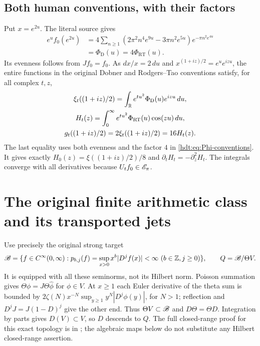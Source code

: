 \documentclass[11pt]{article}
\begin{document}
\subsection{Both human conventions, with their factors}
Put $x=e^{2u}$. The literal source gives
\begin{equation}\label{hdt:eq:Phi-conventions}
\begin{split}
e^u f_0(e^{2u})
&=4\sum_{n\geq1}(2\pi^2n^4e^{9u}-3\pi n^2e^{5u})
e^{-\pi n^2e^{4u}}\\
&=\Phi_{\mathrm D}(u)=4\Phi_{\mathrm{RT}}(u).
\end{split}
\end{equation}
Its evenness follows from $Jf_0=f_0$. As $dx/x=2\,du$ and
$x^{(1+iz)/2}=e^ue^{izu}$, the entire functions in the original
Dobner and Rodgers--Tao conventions satisfy, for all complex $t,z$,
\begin{equation}\label{hdt:eq:constants}
\begin{gathered}
\xi_t((1+iz)/2)=\int_\mathbb R e^{tu^2}\Phi_{\mathrm D}(u)e^{izu}\,du,\\
H_t(z)=\int_0^\infty e^{tu^2}\Phi_{\mathrm{RT}}(u)\cos(zu)\,du,\\
g_t((1+iz)/2)=2\xi_t((1+iz)/2)=16H_t(z).
\end{gathered}
\end{equation}
The last equality uses both evenness and the factor $4$ in
\eqref{hdt:eq:Phi-conventions}. It gives exactly
$H_0(z)=\xi((1+iz)/2)/8$ and $\partial_tH_t=-\partial_z^2H_t$.
The integrals converge with all derivatives because $U_tf_0\in\mathscr E_\pi$.

\section{The original finite arithmetic class and its transported jets}

Use precisely the original strong target
\begin{equation}\label{hdt:eq:B}
\mathscr B=\{f\in C^\infty(0,\infty):
p_{b,j}(f)=\sup_{x>0}x^b|D^jf(x)|<\infty
\ (b\in\mathbb Z,j\geq0)\},\qquad Q=\mathscr B/\Theta V.
\end{equation}
It is equipped with all these seminorms, not its Hilbert norm.
Poisson summation gives $\Theta\phi=J\Theta\widehat\phi$ for
$\phi\in V$. At $x\geq1$ each Euler derivative of the theta sum
is bounded by $2\zeta(N)x^{-N}\sup_{y\geq1}y^N|D^j\phi(y)|$,
for $N>1$; reflection and $D^jJ=J(1-D)^j$ give the other end.
Thus $\Theta V\subset\mathscr B$ and $D\Theta=\Theta D$.
Integration by parts gives $D(V)\subset V$, so $D$ descends to $Q$.
The full closed-range proof for this exact topology is in
\cite{hdt:Closed}; the algebraic maps below do not substitute any
Hilbert closed-range assertion.
\end{document}

